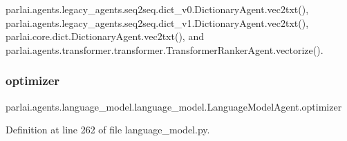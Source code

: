 parlai.\+agents.\+legacy\+\_\+agents.\+seq2seq.\+dict\+\_\+v0.\+Dictionary\+Agent.\+vec2txt(), parlai.\+agents.\+legacy\+\_\+agents.\+seq2seq.\+dict\+\_\+v1.\+Dictionary\+Agent.\+vec2txt(), parlai.\+core.\+dict.\+Dictionary\+Agent.\+vec2txt(), and parlai.\+agents.\+transformer.\+transformer.\+Transformer\+Ranker\+Agent.\+vectorize().

\mbox{\label{classparlai_1_1agents_1_1language__model_1_1language__model_1_1LanguageModelAgent_a222e071975fc874e82e6480c030bbb9d}} 
\subsubsection{\texorpdfstring{optimizer}{optimizer}}
{\footnotesize\ttfamily parlai.\+agents.\+language\+\_\+model.\+language\+\_\+model.\+Language\+Model\+Agent.\+optimizer}



Definition at line 262 of file language\+\_\+model.\+py.



